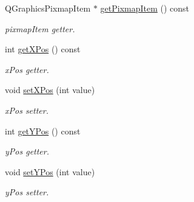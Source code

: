 \begin{DoxyCompactItemize}
\mbox{\label{class_painter_a7a3890c8c871315a3eb88a2e170949b3}} 
Q\+Graphics\+Pixmap\+Item $\ast$ \mbox{\hyperlink{class_painter_a7a3890c8c871315a3eb88a2e170949b3}{get\+Pixmap\+Item}} () const
\begin{DoxyCompactList}\small\item\em pixmap\+Item getter. \end{DoxyCompactList}\item 
\mbox{\label{class_painter_a0c1b4dff1b51f773f145c373d5e9eef9}} 
int \mbox{\hyperlink{class_painter_a0c1b4dff1b51f773f145c373d5e9eef9}{get\+X\+Pos}} () const
\begin{DoxyCompactList}\small\item\em x\+Pos getter. \end{DoxyCompactList}\item 
\mbox{\label{class_painter_a6160fe9c0b29ea1d463d25d52b171b98}} 
void \mbox{\hyperlink{class_painter_a6160fe9c0b29ea1d463d25d52b171b98}{set\+X\+Pos}} (int value)
\begin{DoxyCompactList}\small\item\em x\+Pos setter. \end{DoxyCompactList}\item 
\mbox{\label{class_painter_aaf3dc8e9e8a4cc69a6f06d57e4168269}} 
int \mbox{\hyperlink{class_painter_aaf3dc8e9e8a4cc69a6f06d57e4168269}{get\+Y\+Pos}} () const
\begin{DoxyCompactList}\small\item\em y\+Pos getter. \end{DoxyCompactList}\item 
\mbox{\label{class_painter_a6707d7f9bd221764a08f4b5ecb859bba}} 
void \mbox{\hyperlink{class_painter_a6707d7f9bd221764a08f4b5ecb859bba}{set\+Y\+Pos}} (int value)
\begin{DoxyCompactList}\small\item\em y\+Pos setter. \end{DoxyCompactList}\end{DoxyCompactItemize}
